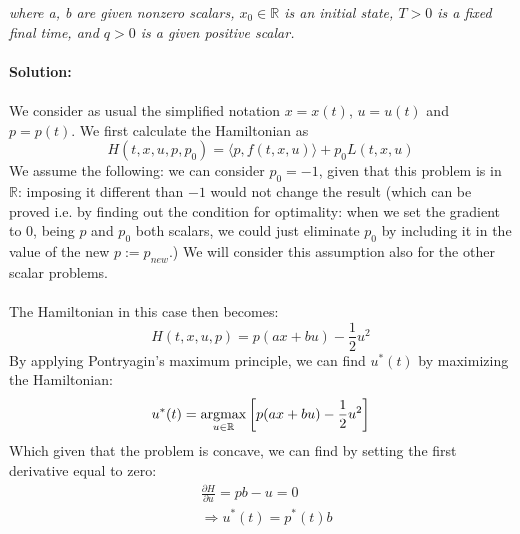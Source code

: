 \emph{where a, b are given nonzero scalars, $x_0 \in \mathbb{R}$ is an initial state, $T > 0 $ is a  fixed final time, and $q > 0$ is a given positive scalar.}
\\
\\
\textbf{Solution:}\\
\\
We consider as usual the simplified notation $x = x(t)$, $u = u(t)$ and $p = p(t)$. We first calculate the Hamiltonian as
\begin{equation}
\label{eq:hamiltonian}
    H(t, x, u, p, p_0) = \langle p, f(t, x, u) \rangle + p_0L(t, x, u)
\end{equation}
We assume the following: we can consider $p_0 = -1$, given that this problem is in $\mathbb{R}$: imposing it different than $-1$ would not change the result (which can be proved i.e. by finding out the condition for optimality: when we set the gradient to 0, being $p$ and $p_0$ both scalars, we could just eliminate $p_0$ by including it in the value of the new $p := p_{new}$.) We will consider this assumption also for the other scalar problems.\\
\\
The Hamiltonian in this case then becomes:
\begin{equation}
    H(t, x, u, p) = p(ax + bu) - \frac{1}{2}u^2
\end{equation}
By applying Pontryagin's maximum principle, we can find $u^*(t)$ by maximizing the Hamiltonian:
\begin{equation}
    u^*(t) = \operatorname*{argmax}_{u \in \mathbb{R}} \left[ p(ax + bu) - \frac{1}{2}u^2 \right]
\end{equation}
Which given that the problem is concave, we can find by setting the first derivative equal to zero:
\begin{align}
   &\frac{\partial H}{\partial u} = pb - u = 0\\
   &\Longrightarrow u^*(t) = p^*(t)b
\end{align}


